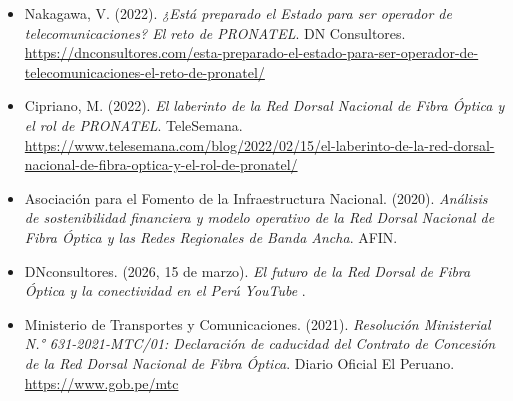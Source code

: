 \begin{itemize}[leftmargin=1.27cm, itemindent=-1.27cm, label={}, itemsep=12pt, parsep=0pt]
\item Nakagawa, V. (2022). \textit{¿Está preparado el Estado para ser operador de telecomunicaciones? El reto de PRONATEL}. DN Consultores.\\
\url{https://dnconsultores.com/esta-preparado-el-estado-para-ser-operador-de-telecomunicaciones-el-reto-de-pronatel/}

\item Cipriano, M. (2022). \textit{El laberinto de la Red Dorsal Nacional de Fibra Óptica y el rol de PRONATEL}. TeleSemana.\\
\url{https://www.telesemana.com/blog/2022/02/15/el-laberinto-de-la-red-dorsal-nacional-de-fibra-optica-y-el-rol-de-pronatel/}

\item Asociación para el Fomento de la Infraestructura Nacional. (2020). \textit{Análisis de sostenibilidad financiera y modelo operativo de la Red Dorsal Nacional de Fibra Óptica y las Redes Regionales de Banda Ancha}. AFIN.\\

\item DNconsultores. (2026, 15 de marzo). \textit{El futuro de la Red Dorsal de Fibra Óptica y la conectividad en el Perú} \textit{YouTube} .\\

\item Ministerio de Transportes y Comunicaciones. (2021). \textit{Resolución Ministerial N.° 631-2021-MTC/01: Declaración de caducidad del Contrato de Concesión de la Red Dorsal Nacional de Fibra Óptica}. Diario Oficial El Peruano.\\
\url{https://www.gob.pe/mtc}

\end{itemize}
